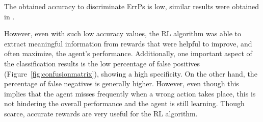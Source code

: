 \documentclass[journal]{IEEEtran}
\begin{document}
{{The obtained accuracy to discriminate ErrPs is low, similar results were obtained in  \cite{Ehrlich2016}.


However, even with such low accuracy values, the RL algorithm was able to extract meaningful information from rewards that were helpful to improve, and often maximize, the agent's performance.  Additionally, one important aspect of the classification results is the low percentage of false positives (Figure~\ref{fig:confusionmatrix}), showing a high specificity. On the other hand, the percentage of false negatives is generally higher.  However, even though this implies that the agent misses frequently when a wrong action takes place, this is not hindering the overall performance and the agent is still learning. Though scarce, accurate rewards are very useful for the RL algorithm.



}}
\end{document}
